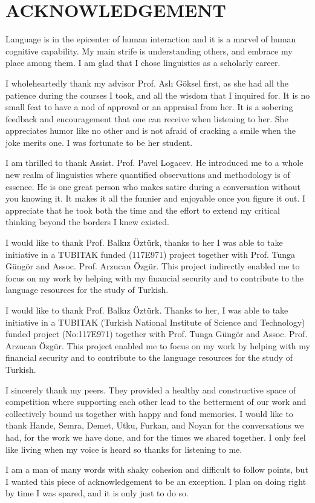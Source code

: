 \chapter*{\MakeUppercase{acknowledgement}}

Language is in the epicenter of human interaction and it is a marvel of human cognitive capability. My main strife is understanding others, and embrace my place among them. I am glad that I chose linguistics as a scholarly career. 

I wholeheartedly thank my advisor Prof. Aslı Göksel first, as she had all the patience during the courses I took, and all the wisdom that I inquired for. It is no small feat to have a nod of approval or an appraisal from her. It is a sobering feedback and encouragement that one can receive when listening to her. She appreciates humor like no other and is not afraid of cracking a smile when the joke merits one. I was fortunate to be her student. 

I am thrilled to thank Assist. Prof. Pavel Logacev. He introduced me to a whole new realm of linguistics where quantified observations and methodology is of essence. He is one great person who makes satire during a conversation without you knowing it. It makes it all the funnier and enjoyable once you figure it out. I appreciate that he took both the time and the effort to extend my critical thinking beyond the borders I knew existed.

I would like to thank Prof. Balkız Öztürk, thanks to her I was able to take initiative in a TUBITAK funded (117E971) project together with Prof. Tunga Güngör and Assoc. Prof. Arzucan Özgür. This project indirectly enabled me to focus on my work by helping with my financial security and to contribute to the language resources for the study of Turkish.

I would like to thank Prof. Balkız Öztürk. Thanks to her, I was able to take initiative in a TUBITAK (Turkish National Institute of Science and Technology) funded project (No:117E971) together with Prof. Tunga Güngör and Assoc. Prof. Arzucan Özgür. This project enabled me to focus on my work by helping with my financial security and to contribute to the language resources for the study of Turkish.

I sincerely thank my peers. They provided a healthy and constructive space of competition where supporting each other lead to the betterment of our work and collectively bound us together with happy and fond memories. I would like to thank Hande, Semra, Demet, Utku, Furkan, and Noyan for the conversations we had, for the work we have done, and for the times we shared together. I only feel like living when my voice is heard so thanks for listening to me. 

I am a man of many words with shaky cohesion and difficult to follow points, but I wanted this piece of acknowledgement to be an exception. I plan on doing right by time I was spared, and it is only just to do so.
